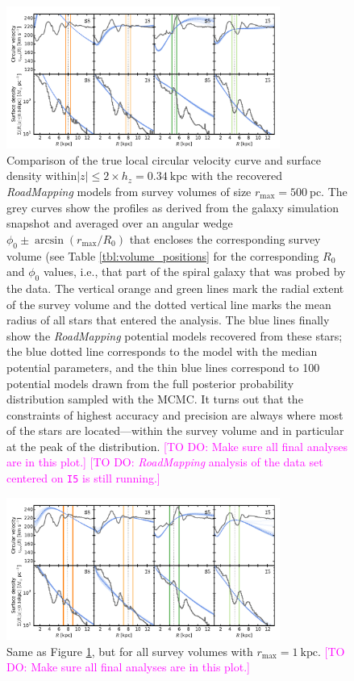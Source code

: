 \documentclass[iop,revtex4,numberedappendix,appendixfloats]{emulateapj}
\newcommand{\RM}{{\sl RoadMapping}}
\newcommand{\Wilma}[1]{\textcolor{Magenta}{#1}}
\begin{document}
\begin{appendix}
\begin{figure}[!htbp]
\centering
\includegraphics[width=0.8\textwidth]{fig/MNdHHdiffSph2_vcirc_surfdens_500pcSuite.pdf}
\caption{Comparison of the true local circular velocity curve and surface density within$|z| \leq 2 \times h_z = 0.34~\text{kpc}$ with the recovered \RM{} models from survey volumes of size $r_\text{max}=500~\text{pc}$. The grey curves show the profiles as derived from the galaxy simulation snapshot and averaged over an angular wedge $\phi_0\pm\arcsin(r_\text{max}/R_0)$ that encloses the corresponding survey volume (see Table \ref{tbl:volume_positions} for the corresponding $R_0$ and $\phi_0$ values, i.e., that part of the spiral galaxy that was probed by the data. The vertical orange and green lines mark the radial extent of the survey volume and the dotted vertical line marks the mean radius of all stars that entered the analysis. The blue lines finally show the \RM{} potential models recovered from these stars; the blue dotted line corresponds to the model with the median potential parameters, and the thin blue lines correspond to 100 potential models drawn from the full posterior probability distribution sampled with the MCMC. It turns out that the constraints of highest accuracy and precision are always where most of the stars are located---within the survey volume and in particular at the peak of the distribution. \Wilma{[TO DO: Make sure all final analyses are in this plot.]} \Wilma{[TO DO: \RM{} analysis of the data set centered on \texttt{I5} is still running.]}}
\label{fig:500pcSuite}
\end{figure}

\begin{figure}[!htbp]
\centering
\includegraphics[width=0.8\textwidth]{fig/MNdHHdiffSph2_vcirc_surfdens_1kpcSuite.pdf}
\caption{Same as Figure \ref{fig:500pcSuite}, but for all survey volumes with $r_\text{max}=1~\text{kpc}$. \Wilma{[TO DO: Make sure all final analyses are in this plot.]}}
\label{fig:1kpcSuite}
\end{figure}


\end{appendix}
\end{document}
